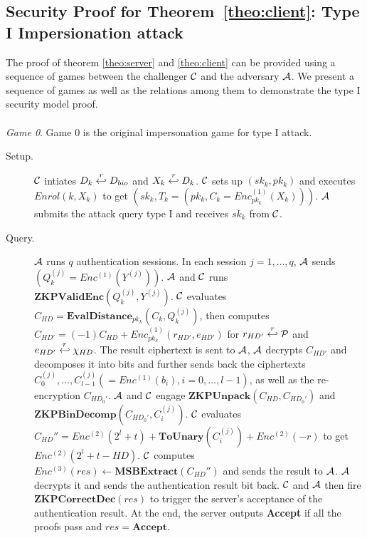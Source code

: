 \subsection{Security Proof for Theorem~\ref{theo:client}: Type I Impersionation attack}
The proof of theorem \ref{theo:server} and  \ref{theo:client} can be provided using a sequence of games between the challenger $\mathcal{C}$ and the adversary $\mathcal{A}$. We present
a sequence of games as well as the relations among them to demonstrate the type I security model proof.\\\\
\textit{Game 0}. Game 0 is the original impersonation game for type I attack.
\begin{description}
	\item [Setup.] $\mathcal{C}$ intiates $D_k \stackrel{r}{\hookleftarrow} D_{bio}$ and $X_k
	\stackrel{r}{\hookleftarrow} D_k$. $\mathcal{C}$ sets up $(sk_k, pk_k)$ and executes
	$Enrol(k, X_k)$ to get $(sk_k, T_k =(pk_k, C_k = Enc^{(1)}_{pk_k}(X_k)))$.
	$\mathcal{A}$ submits the attack query type I and receives $sk_k$ from
	$\mathcal{C}$.
	\item [Query.] $\mathcal{A}$ runs $q$ authentication sessions. In each session $j
	= 1, \dots, q$,
	$\mathcal{A}$ sends $(Q_k^{(j)} = Enc^{(1)}(Y^{(j)}))$. $\mathcal{A}$ and
	$\mathcal{C}$ runs $\mathbf{ZKPValidEnc}(Q_k^{(j)},Y^{(j)})$. $\mathcal{C}$ evaluates
	$C_{HD} = \mathbf{EvalDistance}_{pk_k}(C_k, Q_k^{(j)})$, then computes
	$C_{HD'} = (-1)C_{HD} + Enc_{pk_k}^{(1)}(r_{HD'},e_{HD'})$ for $r_{HD'}
	\stackrel{r}{\hookleftarrow} \mathcal{P}$ and $e_{HD'} \stackrel{r}{\hookleftarrow} \chi_{HD}$. The
	result ciphertext is sent to $\mathcal{A}$, $\mathcal{A}$ decrypts $C_{HD'}$
	and decomposes it into bits and further sends back the ciphertexts $C_0^{(j)}, \dots,
	C_{l-1}^{(j)} (= Enc^{(1)}(b_i), i = 0,\dots, l-1)$, as well as the
	re-encryption $C_{HD_0'}$. $\mathcal{A}$ and $\mathcal{C}$ engage
	$\mathbf{ZKPUnpack}(C_{HD},C_{HD_0'})$ and $\mathbf{ZKPBinDecomp}(C_{HD_0'},
	C_i^{(j)})$.
	$\mathcal{C}$ evaluates $C_{HD}'' = Enc^{(2)}(2^l + t) +
	\mathbf{ToUnary}(C_i^{(j)}) + Enc^{(2)}(-r) $ to get $Enc^{(2)}(2^l + t -
	HD)$. $\mathcal{C}$ computes $Enc^{(3)}(res) \gets
	\mathbf{MSBExtract}(C_{HD}'')$ and sends the result to $\mathcal{A}$. $\mathcal{A}$
	decrypts it and sends the authentication result bit back. $\mathcal{C}$ and
	$\mathcal{A}$ then fire $\mathbf{ZKPCorrectDec}(res)$ to trigger the server's acceptance of the
	authentication result. At the end, the server outputs \textbf{Accept} if
	all the proofs pass and $res = \mathbf{Accept}$.
\end{description}
